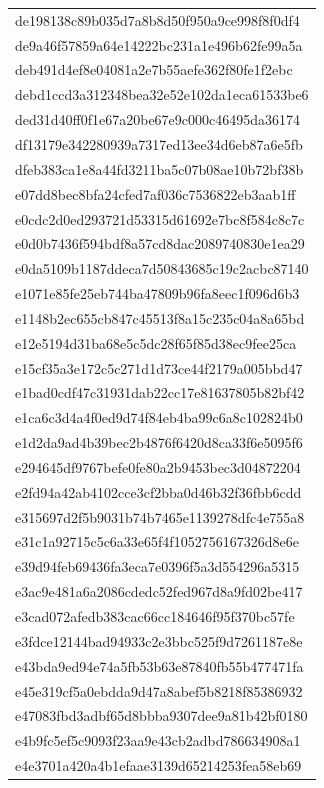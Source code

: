 \begin{tabular}{l}
de198138c89b035d7a8b8d50f950a9ce998f8f0df4 \\
de9a46f57859a64e14222bc231a1e496b62fe99a5a \\
deb491d4ef8e04081a2e7b55aefe362f80fe1f2ebc \\
debd1ccd3a312348bea32e52e102da1eca61533be6 \\
ded31d40ff0f1e67a20be67e9c000c46495da36174 \\
df13179e342280939a7317ed13ee34d6eb87a6e5fb \\
dfeb383ca1e8a44fd3211ba5c07b08ae10b72bf38b \\
e07dd8bec8bfa24cfed7af036c7536822eb3aab1ff \\
e0cdc2d0ed293721d53315d61692e7bc8f584c8c7c \\
e0d0b7436f594bdf8a57cd8dac2089740830e1ea29 \\
e0da5109b1187ddeca7d50843685c19c2acbc87140 \\
e1071e85fe25eb744ba47809b96fa8eec1f096d6b3 \\
e1148b2ec655cb847c45513f8a15c235c04a8a65bd \\
e12e5194d31ba68e5c5dc28f65f85d38ec9fee25ca \\
e15cf35a3e172c5c271d1d73ce44f2179a005bbd47 \\
e1bad0cdf47c31931dab22cc17e81637805b82bf42 \\
e1ca6c3d4a4f0ed9d74f84eb4ba99c6a8c102824b0 \\
e1d2da9ad4b39bec2b4876f6420d8ca33f6e5095f6 \\
e294645df9767befe0fe80a2b9453bec3d04872204 \\
e2fd94a42ab4102cce3cf2bba0d46b32f36fbb6cdd \\
e315697d2f5b9031b74b7465e1139278dfc4e755a8 \\
e31c1a92715c5c6a33e65f4f1052756167326d8e6e \\
e39d94feb69436fa3eca7e0396f5a3d554296a5315 \\
e3ac9e481a6a2086cdedc52fed967d8a9fd02be417 \\
e3cad072afedb383cac66cc184646f95f370bc57fe \\
e3fdce12144bad94933c2e3bbc525f9d7261187e8e \\
e43bda9ed94e74a5fb53b63e87840fb55b477471fa \\
e45e319cf5a0ebdda9d47a8abef5b8218f85386932 \\
e47083fbd3adbf65d8bbba9307dee9a81b42bf0180 \\
e4b9fc5ef5c9093f23aa9e43cb2adbd786634908a1 \\
e4e3701a420a4b1efaae3139d65214253fea58eb69 \\

\end{tabular}
